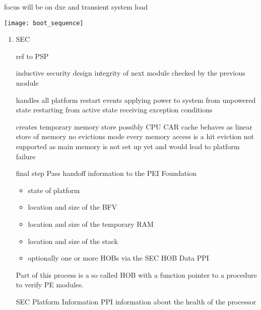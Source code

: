 
focus will be on dxe and transient system load

\texttt{[image: boot\_sequence]}


\begin{enumerate}
    \item{\acf{SEC}}

    ref to PSP

    inductive security design
    integrity of next module checked by the previous module

    handles all platform restart events
    applying power to system from unpowered state
    restarting from active state
    receiving exception conditions

    creates temporary memory store
    possibly CPU \ac{CAR}
    cache behaves as linear store of memory
    no evictions mode
    every memory access is a hit
    eviction not supported as main memory is not set up yet and would lead to platform failure


    final step
    Pass handoff information to the \ac{PEI} Foundation
    \begin{itemize}
        \item state of platform
        \item location and size of the \ac{BFV}
        \item location and size of the temporary RAM
        \item location and size of the stack
        \item optionally one or more \acp{HOB} via the \ac{SEC} \ac{HOB} Data \ac{PPI}
    \end{itemize}


    Part of this process is a so called \ac{HOB} with a function pointer to a procedure to verify PE modules.

    SEC Platform Information PPI
    information about the health of the processor


\end{enumerate}
